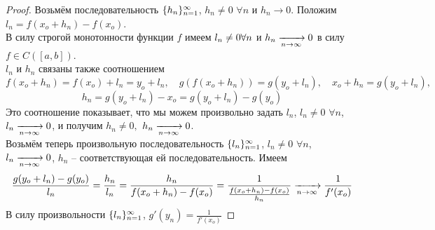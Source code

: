 \begin{proof}
	Возьмём последовательность $\{h_n\}_{n=1}^{\infty}$, $h_n \ne 0$ $\forall n$ и $h_n \to 0$. Положим $l_n = f(x_o + h_n) - f(x_o)$. \\
	В силу строгой монотонности функции $f$ имеем $l_n \ne 0 \space \forall n$ и $h_n \xrightarrow[n\to\infty]{} 0$ в силу $f \in C([a,b])$. \\
     $l_n$ и $h_n$ связаны также соотношением
	$$f(x_o + h_n) = f(x_o) + l_n = y_o + l_n, \quad g(f(x_o + h_n)) = g(y_o + l_n), \quad x_o + h_n = g(y_o + l_n),$$
     $$h_n = g(y_o + l_n) - x_o = g(y_o + l_n) - g(y_o)$$
	Это соотношение показывает, что мы можем произвольно задать $l_n$, $l_n \ne 0$ $\forall n$, $l_n \xrightarrow[n\to\infty]{}0$, и получим $h_n \ne 0,$ $h_n \xrightarrow[n\to\infty]{}0$. \\
	 Возьмём теперь произвольную последовательность $\{l_n\}_{n=1}^{\infty}$,
	  $l_n \ne 0$ $\forall n$,
	   $l_n \xrightarrow[n\to\infty]{} 0$,
	  $h_n$ -- соответствующая ей последовательность. Имеем
    $$\frac{g(y_o + l_n) - g(y_o)}{l_n} = \frac{h_n}{l_n} = \frac{h_n}{f(x_o + h_n) - f(x_o)} = \frac1{\frac{f(x_o + h_n) - f(x_o)}{h_n}} \xrightarrow[n\to\infty]{} \frac1{f'(x_o)}$$
    В силу произвольности $\{l_n\}_{n=1}^{\infty}$, $g'(y_n) = \frac1{f'(x_o)}$
\end{proof}
